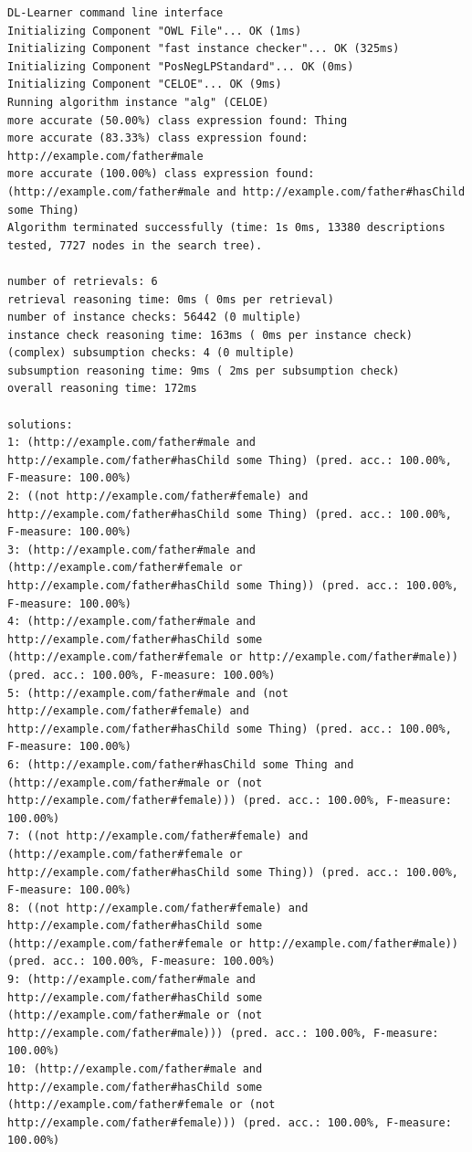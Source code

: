 \documentclass[a4paper,12pt]{scrartcl}
\begin{document}
\begin{lstlisting}
DL-Learner command line interface
Initializing Component "OWL File"... OK (1ms)
Initializing Component "fast instance checker"... OK (325ms)
Initializing Component "PosNegLPStandard"... OK (0ms)
Initializing Component "CELOE"... OK (9ms)
Running algorithm instance "alg" (CELOE)
more accurate (50.00%) class expression found: Thing
more accurate (83.33%) class expression found: http://example.com/father#male
more accurate (100.00%) class expression found: (http://example.com/father#male and http://example.com/father#hasChild some Thing)
Algorithm terminated successfully (time: 1s 0ms, 13380 descriptions tested, 7727 nodes in the search tree).

number of retrievals: 6
retrieval reasoning time: 0ms ( 0ms per retrieval)
number of instance checks: 56442 (0 multiple)
instance check reasoning time: 163ms ( 0ms per instance check)
(complex) subsumption checks: 4 (0 multiple)
subsumption reasoning time: 9ms ( 2ms per subsumption check)
overall reasoning time: 172ms

solutions:
1: (http://example.com/father#male and http://example.com/father#hasChild some Thing) (pred. acc.: 100.00%, F-measure: 100.00%)
2: ((not http://example.com/father#female) and http://example.com/father#hasChild some Thing) (pred. acc.: 100.00%, F-measure: 100.00%)
3: (http://example.com/father#male and (http://example.com/father#female or http://example.com/father#hasChild some Thing)) (pred. acc.: 100.00%, F-measure: 100.00%)
4: (http://example.com/father#male and http://example.com/father#hasChild some (http://example.com/father#female or http://example.com/father#male)) (pred. acc.: 100.00%, F-measure: 100.00%)
5: (http://example.com/father#male and (not http://example.com/father#female) and http://example.com/father#hasChild some Thing) (pred. acc.: 100.00%, F-measure: 100.00%)
6: (http://example.com/father#hasChild some Thing and (http://example.com/father#male or (not http://example.com/father#female))) (pred. acc.: 100.00%, F-measure: 100.00%)
7: ((not http://example.com/father#female) and (http://example.com/father#female or http://example.com/father#hasChild some Thing)) (pred. acc.: 100.00%, F-measure: 100.00%)
8: ((not http://example.com/father#female) and http://example.com/father#hasChild some (http://example.com/father#female or http://example.com/father#male)) (pred. acc.: 100.00%, F-measure: 100.00%)
9: (http://example.com/father#male and http://example.com/father#hasChild some (http://example.com/father#male or (not http://example.com/father#male))) (pred. acc.: 100.00%, F-measure: 100.00%)
10: (http://example.com/father#male and http://example.com/father#hasChild some (http://example.com/father#female or (not http://example.com/father#female))) (pred. acc.: 100.00%, F-measure: 100.00%)
\end{lstlisting}
\end{document}
